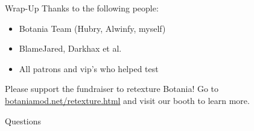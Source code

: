 \documentclass{beamer}
\begin{document}
\begin{frame}{Wrap-Up}
  Thanks to the following people:
  \begin{itemize}
  \item Botania Team (Hubry, Alwinfy, myself)
  \item BlameJared, Darkhax et al.
  \item All patrons and vip's who helped test
  \end{itemize}

  Please support the fundraiser to retexture Botania!
  Go to \href{https://botaniamod.net/retexture.html}{botaniamod.net/retexture.html} and visit our booth to learn more.
\end{frame}

\begin{frame}
  \begin{center}
    \Huge Questions
  \end{center}
\end{frame}
\end{document}

